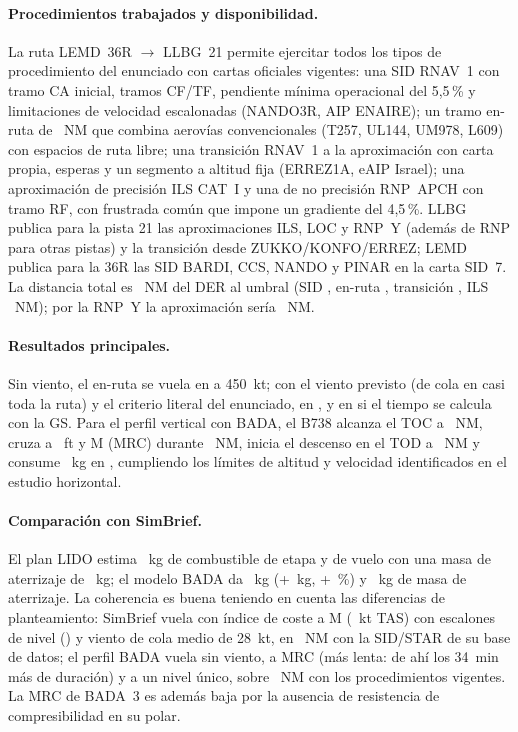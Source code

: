 \documentclass[11pt,a4paper]{article}
\begin{document}
\paragraph{Procedimientos trabajados y disponibilidad.} La ruta LEMD~36R $\rightarrow$ LLBG~21 permite ejercitar todos los tipos de procedimiento del enunciado con cartas oficiales vigentes: una SID RNAV~1 con tramo CA inicial, tramos CF/TF, pendiente mínima operacional del 5,5\,\% y limitaciones de velocidad escalonadas (NANDO3R, AIP ENAIRE); un tramo en-ruta de \enrDist~NM que combina aerovías convencionales (T257, UL144, UM978, L609) con espacios de ruta libre; una transición RNAV~1 a la aproximación con carta propia, esperas y un segmento a altitud fija (ERREZ1A, eAIP Israel); una aproximación de precisión ILS CAT~I y una de no precisión RNP~APCH con tramo RF, con frustrada común que impone un gradiente del 4,5\,\%. LLBG publica para la pista 21 las aproximaciones ILS, LOC y RNP~Y (además de RNP para otras pistas) y la transición desde ZUKKO/KONFO/ERREZ; LEMD publica para la 36R las SID BARDI, CCS, NANDO y PINAR en la carta SID~7. La distancia total es \vTotalD~NM del DER al umbral (SID \sidDist, en-ruta \enrDist, transición \arrDist, ILS \arrToppuRest~NM); por la RNP~Y la aproximación sería \rnpDist~NM.

\paragraph{Resultados principales.} Sin viento, el en-ruta se vuela en \enrTnoW{} a 450~kt; con el viento previsto (de cola en casi toda la ruta) y el criterio literal del enunciado, en \enrTW{}, y en \enrTWg{} si el tiempo se calcula con la GS. Para el perfil vertical con BADA, el B738 alcanza el TOC a \vTOC~NM, cruza a \vHcru~ft y M\vMcru{} (MRC) durante \vCruiseLen~NM, inicia el descenso en el TOD a \vTOD~NM y consume \vFuelTot~kg en \vTime, cumpliendo los \chkN{} límites de altitud y velocidad identificados en el estudio horizontal.

\paragraph{Comparación con SimBrief.} El plan LIDO estima \sbBurn~kg de combustible de etapa y \sbTime{} de vuelo con una masa de aterrizaje de \sbLDW~kg; el modelo BADA da \vFuelTot~kg (+\sbDiffFuel~kg, +\sbDiffFuelPct~\%) y \vMldg~kg de masa de aterrizaje. La coherencia es buena teniendo en cuenta las diferencias de planteamiento: SimBrief vuela con índice de coste \sbCI{} a M\sbMach{} (\sbTAS~kt TAS) con escalones de nivel (\sbSteps) y viento de cola medio de 28~kt, en \sbDist~NM con la SID/STAR de su base de datos; el perfil BADA vuela sin viento, a MRC (más lenta: de ahí los 34~min más de duración) y a un nivel único, sobre \vTotalD~NM con los procedimientos vigentes. La MRC de BADA~3 es además baja por la ausencia de resistencia de compresibilidad en su polar.
\end{document}
